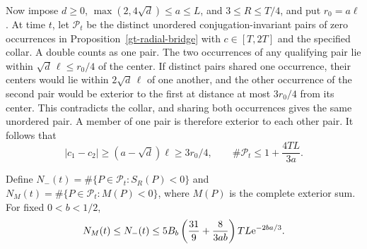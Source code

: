 Now impose \(d\ge0\), \(\max(2,4\sqrt d)\le a\le L\), and
\(3\le R\le T/4\), and put \(r_0=a\ell\). At time \(t\), let
\(\mathcal P_t\) be the distinct unordered conjugation-invariant
pairs of zero occurrences in Proposition~\ref{gt-radial-bridge}
with \(c\in[T,2T]\) and the specified collar. A double counts as
one pair. The two occurrences of any qualifying pair lie within
\(\sqrt d\,\ell\le r_0/4\) of the center. If distinct pairs shared
one occurrence, their centers would lie within \(2\sqrt d\,\ell\)
of one another, and the other occurrence of the second pair would
be exterior to the first at distance at most \(3r_0/4\) from its
center. This contradicts the collar, and sharing both occurrences
gives the same unordered pair. A member of one pair is therefore
exterior to each other pair. It follows that
\begin{equation}
 |c_1-c_2|\ge(a-\sqrt d)\ell\ge3r_0/4,\qquad
 \#\mathcal P_t\le1+\frac{4TL}{3a}.
 \label{gt-pair-packing}
\end{equation}

\begin{theorem}
\label{gt-pair-negative-count}
Define \(N_-(t)=\#\{P\in\mathcal P_t:S_R(P)<0\}\) and
\(N_M(t)=\#\{P\in\mathcal P_t:M(P)<0\}\), where \(M(P)\) is the
complete exterior sum. For fixed \(0<b<1/2\),
\begin{equation}
 N_M(t)\le N_-(t)\le
 5B_b\left(\frac{31}{9}+\frac{8}{3ab}\right) TL\mathrm e^{-2ba/3}.
 \label{gt-negative-slice}
\end{equation}
\end{theorem}

